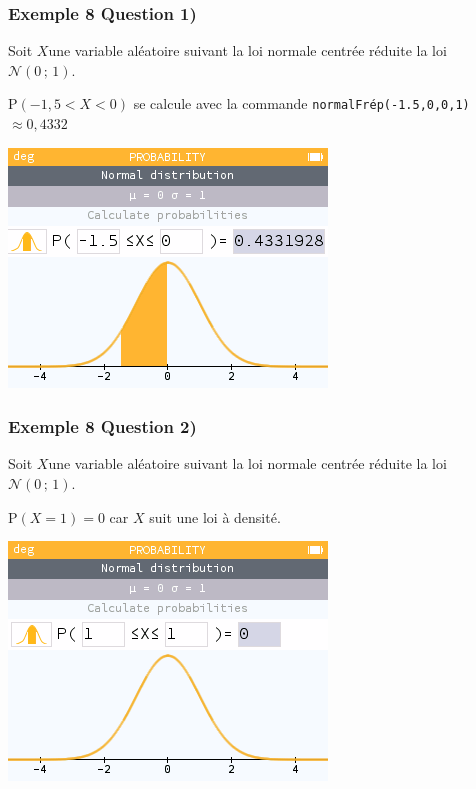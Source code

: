 \documentclass[xcolor=svgnames,t,final]{beamer}
\begin{document}
\begin{frame}
\frametitle{Exemple 8 Question 1)}
\label{exemple8}

Soit  $X $une variable aléatoire suivant la loi normale centrée réduite la loi $\mathcal{N}\left(0 \, ; \, 1\right)$.


$\text{P}\left( -1,5<X<0 \right)$  se calcule avec la commande \texttt{normalFrép(-1.5,0,0,1)}$\approx  0,4332$

\begin{center}
\includegraphics[scale=0.3]{images/exemple8-fig1.png}
\end{center}
\end{frame}



\begin{frame}
\frametitle{Exemple 8 Question 2)}


Soit  $X $une variable aléatoire suivant la loi normale centrée réduite la loi $\mathcal{N}\left(0 \, ; \, 1\right)$.


$\text{P}\left( X = \text{1}  \right)=0$   car $X$ suit une loi à densité.


\begin{center}
\includegraphics[scale=0.3]{images/exemple8-fig2.png}
\end{center}
\end{frame}
\end{document}
